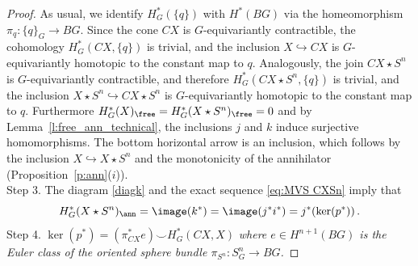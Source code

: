 \documentclass[11pt,a4paper,reqno]{article}
\numberwithin{equation}{section}
\theoremstyle{definition}
\begin{document}
\begin{proof}
 As usual, we identify $H^*_G(\{q\})$ with $H^*(BG)$ via the homeomorphism $\pi_q:\{q\}_G\to BG$. 
Since the cone $CX$ is $G$-equivariantly contractible, the cohomology $H^*_G(CX,\{q\})$ is trivial, and the inclusion $X\hookrightarrow CX$ is $G$-equivariantly homotopic to the constant map to $q$. Analogously, the join $CX \star S^n$ is $G$-equivariantly contractible, and therefore $H^*_G(CX \star S^n,\{q\})$ is trivial, and the inclusion $X \star S^n\hookrightarrow CX \star S^n$ is $G$-equivariantly homotopic to the constant map to $q$. Furthermore $H^*_G(X)_\free=H^*_G(X \star S^n)_\free=0$ and by Lemma~\ref{l:free_ann_technical}, the inclusions $j$ and $k$ induce surjective homomorphisms.
The bottom horizontal arrow is an inclusion, which follows by the inclusion $X\hookrightarrow X \star S^n$ and the monotonicity of the annihilator (Proposition~\ref{p:ann}($i$)).
\\[1mm]
{\sc Step 3.}
The diagram  \eqref{diagk} and 
the exact sequence \eqref{eq:MVS CXSn} imply that 
\begin{equation}\label{eq:First part}
    H^*_G(X \star S^n)_\ann
=
\image(k^*)
=
\image(j^*i^*)
=
j^*(\ker(p^*)) \, . 
\end{equation}
{\sc Step 4.} 
$ \ker(p^*)
=
(\pi^*_{CX}e)\smallsmile H_G^*(CX,X) $ 
{\it where 
$e\in H^{n+1}(BG)$ is 
the Euler class  of the oriented sphere bundle 
$\pi_{S^n}:S^n_G\to BG $.}


\end{proof}
\end{document}
